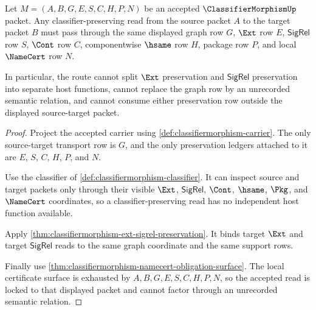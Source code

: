 \begin{theorem}
\label{thm:classifier-morphism-source-target-route-lock}
Let $M=(A,B,G,E,S,C,H,P,N)$ be an accepted $\ClassifierMorphismUp$ packet. Any classifier-preserving read from the source packet $A$ to the target packet $B$ must pass through the same displayed graph row $G$, $\Ext$ row $E$, $\mathsf{SigRel}$ row $S$, $\Cont$ row $C$, componentwise $\hsame$ row $H$, package row $P$, and local $\NameCert$ row $N$.

In particular, the route cannot split $\Ext$ preservation and $\mathsf{SigRel}$ preservation into separate host functions, cannot replace the graph row by an unrecorded semantic relation, and cannot consume either preservation row outside the displayed source-target packet.
\end{theorem}
\begin{proof}
Project the accepted carrier using \autoref{def:classifiermorphism-carrier}. The only source-target transport row is $G$, and the only preservation ledgers attached to it are $E$, $S$, $C$, $H$, $P$, and $N$.

Use the classifier of \autoref{def:classifiermorphism-classifier}. It can inspect source and target packets only through their visible $\Ext$, $\mathsf{SigRel}$, $\Cont$, $\hsame$, $\Pkg$, and $\NameCert$ coordinates, so a classifier-preserving read has no independent host function available.

Apply \autoref{thm:classifiermorphism-ext-sigrel-preservation}. It binds target $\Ext$ and target $\mathsf{SigRel}$ reads to the same graph coordinate and the same support rows.

Finally use \autoref{thm:classifiermorphism-namecert-obligation-surface}. The local certificate surface is exhausted by $A,B,G,E,S,C,H,P,N$, so the accepted read is locked to that displayed packet and cannot factor through an unrecorded semantic relation.
\end{proof}

